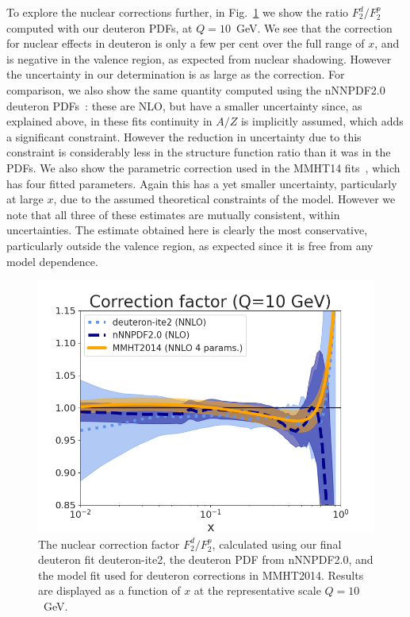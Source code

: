 \documentclass[11pt,a4paper]{article}
\begin{document}
To explore the nuclear corrections further, in Fig.~\ref{fig:nuclear_corrn}
we show the ratio $F_2^d/F_2^p$ computed with our deuteron  PDFs, at $Q=10$~GeV.
We see that the correction for nuclear effects in deuteron is only a few per
cent over the full range of $x$, and is negative in the valence region, as 
expected from nuclear shadowing. However the uncertainty in our determination
is as large as the correction. For comparison, we also show the same 
quantity computed using the nNNPDF2.0 deuteron PDFs~\cite{AbdulKhalek:2020yuc}:
these are NLO, but have a smaller uncertainty since, as explained above, in
these fits continuity in $A/Z$ is implicitly assumed, which adds a significant
constraint. However the reduction in uncertainty due to this constraint is
considerably less in the structure function ratio than it was in the PDFs.
We also show the parametric correction used in the MMHT14
fits~\cite{Harland-Lang:2014zoa}, which has four fitted parameters.
Again this has a yet smaller uncertainty, particularly at large $x$, due to the
assumed theoretical constraints of the model. However we note that all three of
these estimates are mutually consistent, within uncertainties. The estimate
obtained here is clearly the most conservative, particularly outside the
valence region, as expected since it is free from any model dependence. 

\begin{figure}[!t]
\centering
\includegraphics[width=0.5\linewidth]{plots/deut_10.png}
\caption{The nuclear correction factor $F_2^d/F_2^p$, calculated using our final
  deuteron fit deuteron-ite2, the deuteron PDF from nNNPDF2.0, and the model
  fit used for deuteron corrections in MMHT2014. Results are displayed as a
  function of $x$ at the representative scale $Q=10$~GeV.}
\label{fig:nuclear_corrn}
\end{figure}
\end{document}
